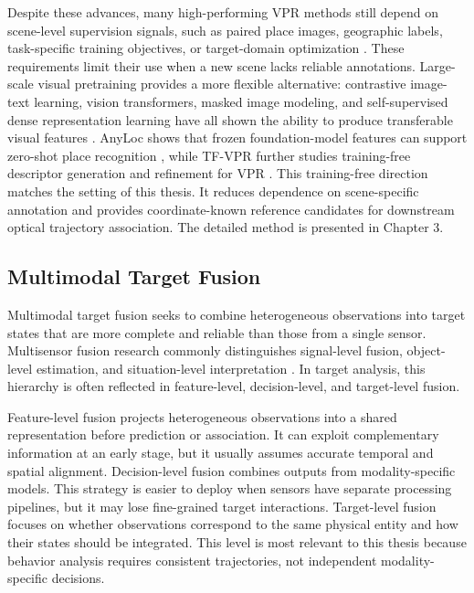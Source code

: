 Despite these advances, many high-performing VPR methods still depend on scene-level supervision signals, such as paired place images, geographic labels, task-specific training objectives, or target-domain optimization \cite{arandjelovic2016netvlad,berton2022cosplace,alibey2023mixvpr}. These requirements limit their use when a new scene lacks reliable annotations. Large-scale visual pretraining provides a more flexible alternative: contrastive image-text learning, vision transformers, masked image modeling, and self-supervised dense representation learning have all shown the ability to produce transferable visual features \cite{radford2021clip,dosovitskiy2020vit,he2022mae,oquab2023dinov2}. AnyLoc shows that frozen foundation-model features can support zero-shot place recognition \cite{keetha2024anyloc}, while TF-VPR further studies training-free descriptor generation and refinement for VPR \cite{wang2026tfvpr}. This training-free direction matches the setting of this thesis. It reduces dependence on scene-specific annotation and provides coordinate-known reference candidates for downstream optical trajectory association. The detailed method is presented in Chapter 3.

\subsection{Multimodal Target Fusion}
Multimodal target fusion seeks to combine heterogeneous observations into target states that are more complete and reliable than those from a single sensor. Multisensor fusion research commonly distinguishes signal-level fusion, object-level estimation, and situation-level interpretation \cite{hall1997multisensor,blasch2009blueprint}. In target analysis, this hierarchy is often reflected in feature-level, decision-level, and target-level fusion.

Feature-level fusion projects heterogeneous observations into a shared representation before prediction or association. It can exploit complementary information at an early stage, but it usually assumes accurate temporal and spatial alignment. Decision-level fusion combines outputs from modality-specific models. This strategy is easier to deploy when sensors have separate processing pipelines, but it may lose fine-grained target interactions. Target-level fusion focuses on whether observations correspond to the same physical entity and how their states should be integrated. This level is most relevant to this thesis because behavior analysis requires consistent trajectories, not independent modality-specific decisions.

